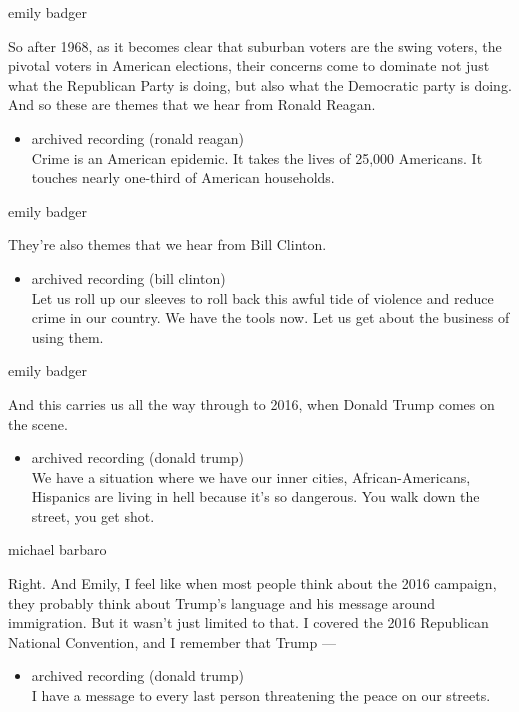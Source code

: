 emily badger

So after 1968, as it becomes clear that suburban voters are the swing
voters, the pivotal voters in American elections, their concerns come to
dominate not just what the Republican Party is doing, but also what the
Democratic party is doing. And so these are themes that we hear from
Ronald Reagan.

\begin{itemize}
\tightlist
\item
  archived recording (ronald reagan)\\
  Crime is an American epidemic. It takes the lives of 25,000 Americans.
  It touches nearly one-third of American households.
\end{itemize}

emily badger

They're also themes that we hear from Bill Clinton.

\begin{itemize}
\tightlist
\item
  archived recording (bill clinton)\\
  Let us roll up our sleeves to roll back this awful tide of violence
  and reduce crime in our country. We have the tools now. Let us get
  about the business of using them.
\end{itemize}

emily badger

And this carries us all the way through to 2016, when Donald Trump comes
on the scene.

\begin{itemize}
\tightlist
\item
  archived recording (donald trump)\\
  We have a situation where we have our inner cities, African-Americans,
  Hispanics are living in hell because it's so dangerous. You walk down
  the street, you get shot.
\end{itemize}

michael barbaro

Right. And Emily, I feel like when most people think about the 2016
campaign, they probably think about Trump's language and his message
around immigration. But it wasn't just limited to that. I covered the
2016 Republican National Convention, and I remember that Trump ---

\begin{itemize}
\tightlist
\item
  archived recording (donald trump)\\
  I have a message to every last person threatening the peace on our
  streets.
\end{itemize}

